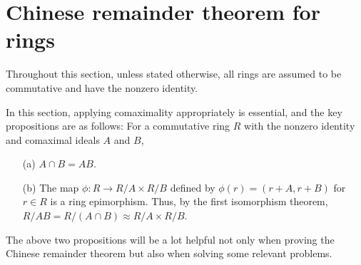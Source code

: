 \section{Chinese remainder theorem for rings}

Throughout this section, unless stated otherwise, all rings are assumed to be commutative and have the nonzero identity.
\begin{rmk}
    In this section, applying comaximality appropriately is essential, and the key propositions are as follows: For a commutative ring $R$ with the nonzero identity and comaximal ideals $A$ and $B$,
    \begin{enumerate}
        \item[(a)]
        {
            $A\cap B=AB$.
        }
        \item[(b)]
        {
            The map $\phi: R\rightarrow R/A\times R/B$ defined by $\phi(r)=(r+A, r+B)$ for $r\in R$ is a ring epimorphism.
            Thus, by the first isomorphism theorem, $R/AB=R/(A\cap B)\approx R/A\times R/B$.
        }
    \end{enumerate}
    The above two propositions will be a lot helpful not only when proving the Chinese remainder theorem but also when solving some relevant problems.
\end{rmk}

